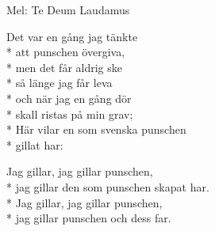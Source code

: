 \begin{SongText}
    \begin{SongInfo}
        Mel: Te Deum Laudamus
    \end{SongInfo}
    \begin{SongVerse}
        Det var en gång jag tänkte\\*%
        att punschen övergiva,\\*%
        men det får aldrig ske\\*%
        så länge jag får leva\\*%
        och när jag en gång dör\\*%
        skall ristas på min grav;\\*%
        Här vilar en som svenska punschen\\*%
        gillat har:
    \end{SongVerse}
    \begin{SongVerse}
        Jag gillar, jag gillar punschen,\\*%
        jag gillar den som punschen skapat har.\\*%
        Jag gillar, jag gillar punschen,\\*%
        jag gillar punschen och dess far.
    \end{SongVerse}
\end{SongText}